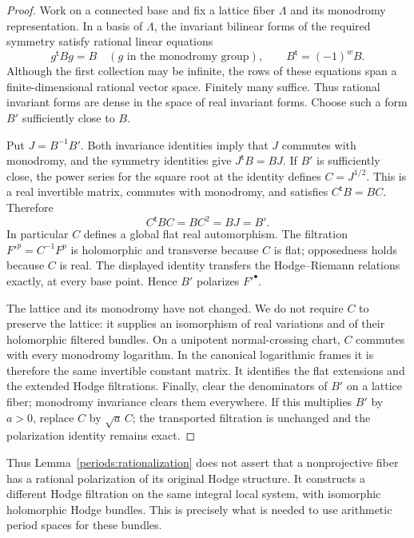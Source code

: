 \begin{proof}
Work on a connected base and fix a lattice fiber $\Lambda$ and its monodromy
representation.  In a basis of $\Lambda$, the invariant bilinear forms of the
required symmetry satisfy rational linear equations
\[
 g^{\mathsf t}Bg=B\quad(g\text{ in the monodromy group}),
 \qquad B^{\mathsf t}=(-1)^wB.
\]
Although the first collection may be infinite, the rows of these equations
span a finite-dimensional rational vector space.  Finitely many suffice.
Thus rational invariant forms are dense in the space of real invariant
forms.  Choose such a form $B'$ sufficiently close to $B$.

Put $J=B^{-1}B'$.  Both invariance identities imply that $J$ commutes with
monodromy, and the symmetry identities give
$J^{\mathsf t}B=BJ$.  If $B'$ is sufficiently close, the power series for the
square root at the identity defines $C=J^{1/2}$.  This is a real invertible
matrix, commutes with monodromy, and satisfies $C^{\mathsf t}B=BC$.
Therefore
\[
 C^{\mathsf t}BC=BC^2=BJ=B'.
\]
In particular $C$ defines a global flat real automorphism.  The filtration
$F'^p=C^{-1}F^p$ is holomorphic and transverse because $C$ is flat; opposedness
holds because $C$ is real.  The displayed identity transfers the
Hodge--Riemann relations exactly, at every base point.  Hence $B'$ polarizes
$F'^\bullet$.

The lattice and its monodromy have not changed.  We do not require $C$ to
preserve the lattice: it supplies an isomorphism of real variations and of
their holomorphic filtered bundles.  On a unipotent normal-crossing chart,
$C$ commutes with every monodromy logarithm.  In the canonical logarithmic
frames it is therefore the same invertible constant matrix.  It identifies
the flat extensions and the extended Hodge filtrations.  Finally, clear the
denominators of $B'$ on a lattice fiber; monodromy invariance clears them
everywhere.  If this multiplies $B'$ by $a>0$, replace $C$ by $\sqrt a\,C$;
the transported filtration is unchanged and the polarization identity
remains exact.
\end{proof}

Thus Lemma~\ref{periods:rationalization} does not assert that a nonprojective
fiber has a rational polarization of its original Hodge structure.  It
constructs a different Hodge filtration on the same integral local system,
with isomorphic holomorphic Hodge bundles.  This is precisely what is needed
to use arithmetic period spaces for these bundles.

